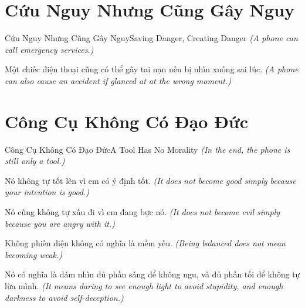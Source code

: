 \section{Cứu Nguy Nhưng Cũng Gây Nguy}
\begin{truyen}{Cứu Nguy Nhưng Cũng Gây Nguy}{Saving Danger, Creating Danger}
\textit{(A phone can call emergency services.)}

Một chiếc điện thoại cũng có thể gây tai nạn nếu bị nhìn xuống sai lúc.
\textit{(A phone can also cause an accident if glanced at at the wrong moment.)}

\end{truyen}

\section{Công Cụ Không Có Đạo Đức}
\begin{truyen}{Công Cụ Không Có Đạo Đức}{A Tool Has No Morality}
\textit{(In the end, the phone is still only a tool.)}

Nó không tự tốt lên vì em có ý định tốt.
\textit{(It does not become good simply because your intention is good.)}

Nó cũng không tự xấu đi vì em đang bực nó.
\textit{(It does not become evil simply because you are angry with it.)}

\end{truyen}

\begin{baihoc}
Không phiến diện không có nghĩa là mềm yếu.
\textit{(Being balanced does not mean becoming weak.)}

Nó có nghĩa là dám nhìn đủ phần sáng để không ngu, và đủ phần tối để không tự lừa mình.
\textit{(It means daring to see enough light to avoid stupidity, and enough darkness to avoid self-deception.)}
\end{baihoc}

